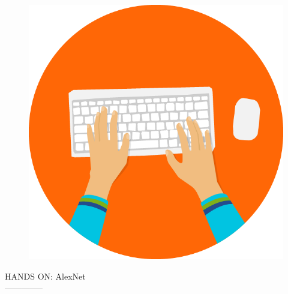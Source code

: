 \documentclass[10pt, compress]{beamer}
\begin{document}
\begin{frame}
  \vspace{.5cm}
  \begin{figure}
    \includegraphics[width=.2\linewidth, left]{imgs/hands_on_1}
  \end{figure}
  HANDS ON: AlexNet \\
  -------------- \\

\end{frame}


%

%
%
%
%
\end{document}
